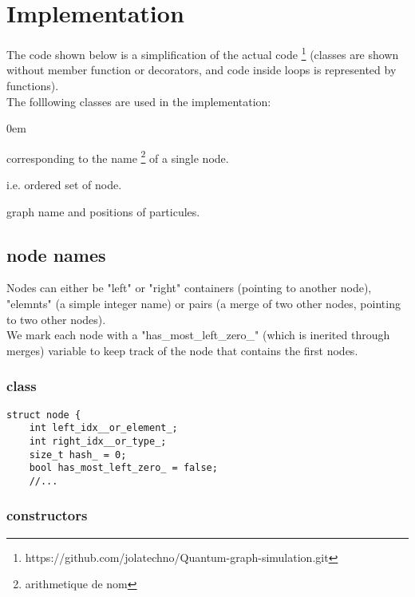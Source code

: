 \documentclass[11pt]{article}
\begin{document}
\section{Implementation}

The code shown below is a simplification of the actual code  \footnote{https://github.com/jolatechno/Quantum-graph-simulation.git} (classes are shown without member function or decorators, and code inside loops is represented by functions).\\

The folllowing classes are used in the implementation:

\begin{description}
\addtolength{\itemindent}{0.80cm}
\itemsep0em 
\item[node names] corresponding to the name \footnote{arithmetique de nom} of a single node.
\item[graph names] i.e. ordered set of node.
\item[graphs with particules] graph name and positions of particules.
\item[superposition of graphs]
\end{description}

\subsection{node names}

Nodes can either be "left" or "right" containers (pointing to another node), "elemnts" (a simple integer name) or pairs (a merge of two other nodes, pointing to two other nodes).\\

We mark each node with a "has\_most\_left\_zero\_" (which is inerited through merges)  variable to keep track of the node that contains the first nodes.

\subsubsection{class}

\begin{lstlisting}[style=CStyle]
struct node {
	int left_idx__or_element_;
	int right_idx__or_type_;
	size_t hash_ = 0;
	bool has_most_left_zero_ = false;
	//...
\end{lstlisting}

\subsubsection{constructors}
\end{document}
